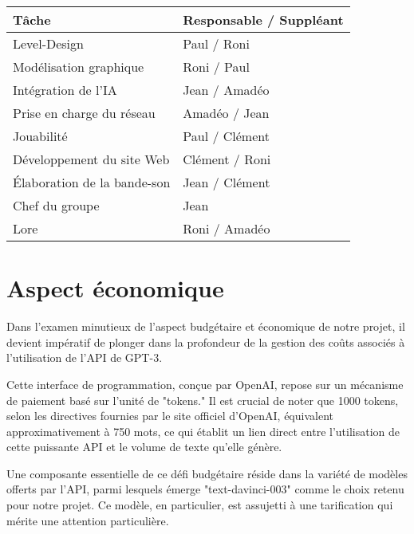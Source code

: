\documentclass{report}
\begin{document}
\begin{center}
\begin{tabular}{@{}ll@{}}
\toprule
\textbf{Tâche}               & \textbf{Responsable / Suppléant} \\ \midrule
Level-Design                 & Paul / Roni                       \\
Modélisation graphique      & Roni / Paul                       \\
Intégration de l’IA         & Jean / Amadéo                    \\
Prise en charge du réseau   & Amadéo / Jean                    \\
Jouabilité                   & Paul / Clément                   \\
Développement du site Web   & Clément / Roni                   \\
Élaboration de la bande-son & Jean / Clément                   \\
Chef du groupe               & Jean                              \\
Lore                         & Roni / Amadéo                    \\ \bottomrule
\end{tabular}
\end{center}

\newpage


\section{Aspect économique}
Dans l’examen minutieux de l’aspect budgétaire et économique de notre projet, il
devient impératif de plonger dans la profondeur de la gestion des coûts associés à
l’utilisation de l’API de GPT-3. \newline

Cette interface de programmation, conçue par OpenAI,
repose sur un mécanisme de paiement basé sur l’unité de "tokens." Il est crucial de noter
que 1000 tokens, selon les directives fournies par le site officiel d’OpenAI, équivalent
approximativement à 750 mots, ce qui établit un lien direct entre l’utilisation de cette
puissante API et le volume de texte qu’elle génère. \newline

Une composante essentielle de ce défi budgétaire réside dans la variété de modèles
offerts par l’API, parmi lesquels émerge "text-davinci-003" comme le choix retenu pour
notre projet. Ce modèle, en particulier, est assujetti à une tarification qui mérite une
attention particulière. \newline
\end{document}
